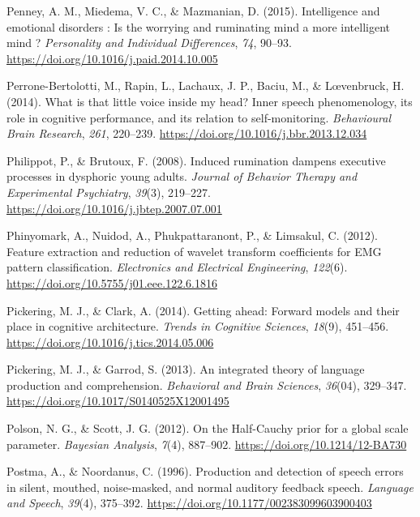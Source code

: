 \documentclass[a4paper,12pt,twoside,onecolumn,openright,final,oldfontcommands]{memoir}
\begin{document}
\leavevmode\hypertarget{ref-Penney2015}{}%
Penney, A. M., Miedema, V. C., \& Mazmanian, D. (2015). Intelligence and emotional disorders : Is the worrying and ruminating mind a more intelligent mind ? \emph{Personality and Individual Differences}, \emph{74}, 90--93. \url{https://doi.org/10.1016/j.paid.2014.10.005}

\leavevmode\hypertarget{ref-Perrone-Bertolotti2014}{}%
Perrone-Bertolotti, M., Rapin, L., Lachaux, J. P., Baciu, M., \& Lœvenbruck, H. (2014). What is that little voice inside my head? Inner speech phenomenology, its role in cognitive performance, and its relation to self-monitoring. \emph{Behavioural Brain Research}, \emph{261}, 220--239. \url{https://doi.org/10.1016/j.bbr.2013.12.034}

\leavevmode\hypertarget{ref-Philippot2008}{}%
Philippot, P., \& Brutoux, F. (2008). Induced rumination dampens executive processes in dysphoric young adults. \emph{Journal of Behavior Therapy and Experimental Psychiatry}, \emph{39}(3), 219--227. \url{https://doi.org/10.1016/j.jbtep.2007.07.001}

\leavevmode\hypertarget{ref-phinyomark_feature_2012}{}%
Phinyomark, A., Nuidod, A., Phukpattaranont, P., \& Limsakul, C. (2012). Feature extraction and reduction of wavelet transform coefficients for EMG pattern classification. \emph{Electronics and Electrical Engineering}, \emph{122}(6). \url{https://doi.org/10.5755/j01.eee.122.6.1816}

\leavevmode\hypertarget{ref-pickering_getting_2014}{}%
Pickering, M. J., \& Clark, A. (2014). Getting ahead: Forward models and their place in cognitive architecture. \emph{Trends in Cognitive Sciences}, \emph{18}(9), 451--456. \url{https://doi.org/10.1016/j.tics.2014.05.006}

\leavevmode\hypertarget{ref-pickering_integrated_2013}{}%
Pickering, M. J., \& Garrod, S. (2013). An integrated theory of language production and comprehension. \emph{Behavioral and Brain Sciences}, \emph{36}(04), 329--347. \url{https://doi.org/10.1017/S0140525X12001495}

\leavevmode\hypertarget{ref-polson_half-cauchy_2012}{}%
Polson, N. G., \& Scott, J. G. (2012). On the Half-Cauchy prior for a global scale parameter. \emph{Bayesian Analysis}, \emph{7}(4), 887--902. \url{https://doi.org/10.1214/12-BA730}

\leavevmode\hypertarget{ref-postma_production_1996}{}%
Postma, A., \& Noordanus, C. (1996). Production and detection of speech errors in silent, mouthed, noise-masked, and normal auditory feedback speech. \emph{Language and Speech}, \emph{39}(4), 375--392. \url{https://doi.org/10.1177/002383099603900403}
\end{document}
